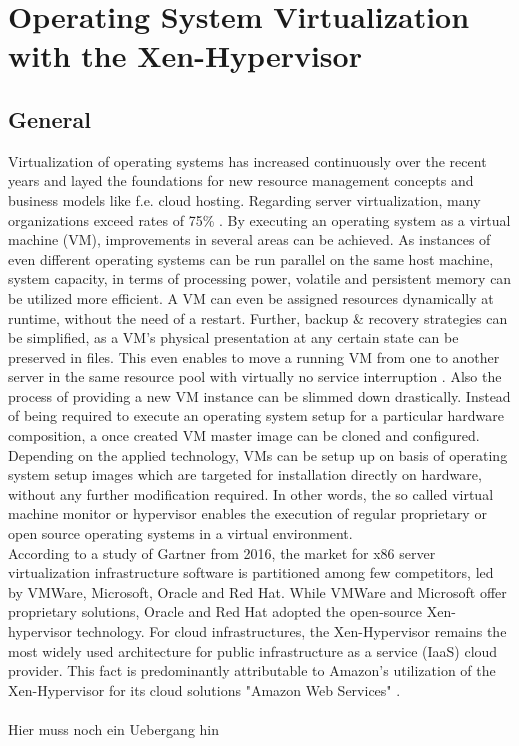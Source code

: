 \chapter{Operating System Virtualization with the Xen-Hypervisor}
\label{cha:2}

\section{General}

Virtualization of operating systems has increased continuously over the recent years and layed the foundations for new resource management concepts and business models like f.e. cloud hosting. Regarding server virtualization, many organizations exceed rates of 75\% \cite{gartnervmmarket}. By executing an operating system as a virtual machine (VM), improvements in several areas can be achieved. As instances of even different operating systems can be run parallel on the same host machine, system capacity, in terms of processing power, volatile and persistent memory can be utilized more efficient. A VM can even be assigned resources dynamically at runtime, without the need of a restart. Further, backup \& recovery strategies can be simplified, as a VM's physical presentation at any certain state can be preserved in files. This even enables to move a running VM from one to another server in the same resource pool with virtually no service interruption \cite{migratevms}. Also the process of providing a new VM instance can be slimmed down drastically. Instead of being required to execute an operating system setup for a particular hardware composition, a once created VM master image can be cloned and configured. Depending on the applied technology, VMs can be setup up on basis of operating system setup images which are targeted for installation directly on hardware, without any further modification required. In other words, the so called virtual machine monitor or hypervisor enables the execution of regular proprietary or open source operating systems in a virtual environment. \\
According to a study of Gartner from 2016, the market for x86 server virtualization infrastructure software is partitioned among few competitors, led by VMWare, Microsoft, Oracle and Red Hat. While VMWare and Microsoft offer proprietary solutions, Oracle and Red Hat adopted the open-source Xen-hypervisor technology. For cloud infrastructures, the Xen-Hypervisor remains the most widely used architecture for public infrastructure as a service (IaaS) cloud provider. This fact is predominantly attributable to Amazon's utilization of the Xen-Hypervisor for its cloud solutions "Amazon Web Services" \cite{bittman2016magic}.
\\~\\
Hier muss noch ein Uebergang hin
\\



